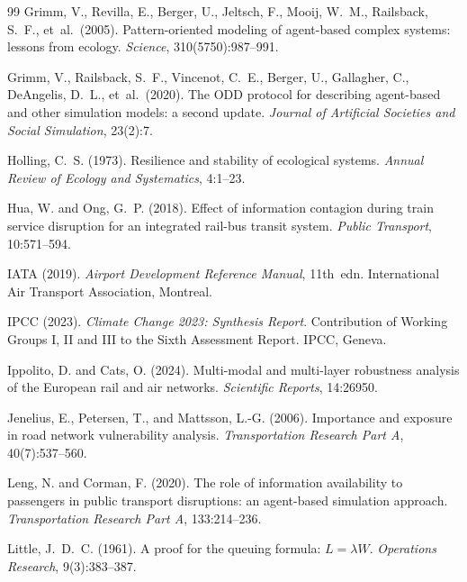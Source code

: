\documentclass[12pt,a4paper]{article}
\begin{document}
\begin{thebibliography}{99}
Grimm, V., Revilla, E., Berger, U., Jeltsch, F., Mooij, W.~M., Railsback, S.~F.,
et~al.\ (2005).
Pattern-oriented modeling of agent-based complex systems: lessons from ecology.
\textit{Science}, 310(5750):987--991.

Grimm, V., Railsback, S.~F., Vincenot, C.~E., Berger, U., Gallagher, C.,
DeAngelis, D.~L., et~al.\ (2020).
The ODD protocol for describing agent-based and other simulation models: a second update.
\textit{Journal of Artificial Societies and Social Simulation}, 23(2):7.

Holling, C.~S. (1973).
Resilience and stability of ecological systems.
\textit{Annual Review of Ecology and Systematics}, 4:1--23.

Hua, W. and Ong, G.~P. (2018).
Effect of information contagion during train service disruption for an integrated
rail-bus transit system.
\textit{Public Transport}, 10:571--594.

IATA (2019).
\textit{Airport Development Reference Manual}, 11th~edn.
International Air Transport Association, Montreal.

IPCC (2023).
\textit{Climate Change 2023: Synthesis Report}.
Contribution of Working Groups I, II and III to the Sixth Assessment Report.
IPCC, Geneva.

Ippolito, D. and Cats, O. (2024).
Multi-modal and multi-layer robustness analysis of the European rail and air networks.
\textit{Scientific Reports}, 14:26950.

Jenelius, E., Petersen, T., and Mattsson, L.-G. (2006).
Importance and exposure in road network vulnerability analysis.
\textit{Transportation Research Part A}, 40(7):537--560.

Leng, N. and Corman, F. (2020).
The role of information availability to passengers in public transport disruptions:
an agent-based simulation approach.
\textit{Transportation Research Part A}, 133:214--236.

Little, J.~D.~C. (1961).
A proof for the queuing formula: {$L = \lambda W$}.
\textit{Operations Research}, 9(3):383--387.


\end{thebibliography}
\end{document}
